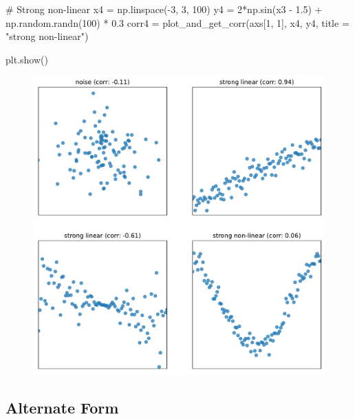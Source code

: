 \documentclass[
  letterpaper,
  DIV=11,
  numbers=noendperiod]{scrreprt}
\newenvironment{Shaded}{\begin{snugshade}}{\end{snugshade}}
\newcommand{\CommentTok}[1]{\textcolor[rgb]{0.37,0.37,0.37}{#1}}
\newcommand{\DecValTok}[1]{\textcolor[rgb]{0.68,0.00,0.00}{#1}}
\newcommand{\FloatTok}[1]{\textcolor[rgb]{0.68,0.00,0.00}{#1}}
\newcommand{\NormalTok}[1]{\textcolor[rgb]{0.00,0.23,0.31}{#1}}
\newcommand{\OperatorTok}[1]{\textcolor[rgb]{0.37,0.37,0.37}{#1}}
\newcommand{\StringTok}[1]{\textcolor[rgb]{0.13,0.47,0.30}{#1}}
\begin{document}
\begin{Shaded}
\begin{Highlighting}[]
\CommentTok{\# Strong non{-}linear}
\NormalTok{x4 }\OperatorTok{=}\NormalTok{ np.linspace(}\OperatorTok{{-}}\DecValTok{3}\NormalTok{, }\DecValTok{3}\NormalTok{, }\DecValTok{100}\NormalTok{)}
\NormalTok{y4 }\OperatorTok{=} \DecValTok{2}\OperatorTok{*}\NormalTok{np.sin(x3 }\OperatorTok{{-}} \FloatTok{1.5}\NormalTok{) }\OperatorTok{+}\NormalTok{ np.random.randn(}\DecValTok{100}\NormalTok{) }\OperatorTok{*} \FloatTok{0.3}
\NormalTok{corr4 }\OperatorTok{=}\NormalTok{ plot\_and\_get\_corr(axs[}\DecValTok{1}\NormalTok{, }\DecValTok{1}\NormalTok{], x4, y4, title }\OperatorTok{=} \StringTok{"strong non{-}linear"}\NormalTok{)}

\NormalTok{plt.show()}
\end{Highlighting}
\end{Shaded}

\begin{figure}[H]

{\centering \includegraphics{intro_to_modeling/intro_to_modeling_files/figure-pdf/cell-3-output-1.pdf}

}

\end{figure}

\hypertarget{alternate-form}{%
\subsection{Alternate Form}\label{alternate-form}}
\end{document}
